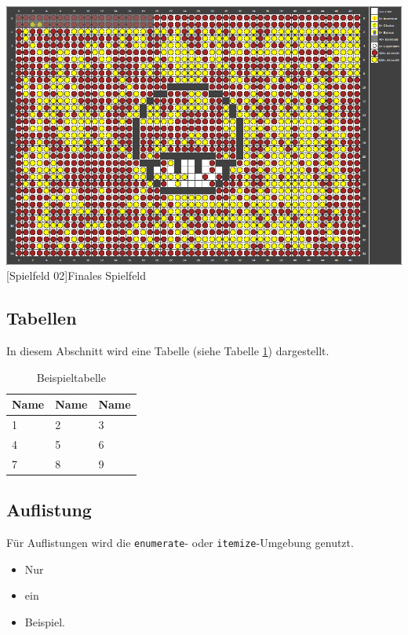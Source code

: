 \documentclass[12pt,a4paper,bibliography=totocnumbered,listof=totocnumbered]{article}
\begin{document}
\vspace{1em}
\begin{minipage}{\linewidth}
	\centering
	\includegraphics[width=0.6\linewidth]{pics/gamefield02.png}
	[Spielfeld 02]{Finales Spielfeld\footnotemark }
	\label{fig:reversi2}
\end{minipage}

\subsection{Tabellen}
In diesem Abschnitt wird eine Tabelle (siehe Tabelle \ref{tab:beispiel}) dargestellt.

\vspace{1em}
\begin{table}[!h]
	\centering
	\begin{tabular}{|l|l|l|}
		\hline
		\textbf{Name} & \textbf{Name} & \textbf{Name}\\
		\hline
		1 & 2 & 3\\
		\hline
		4 & 5 & 6\\
		\hline
		7 & 8 & 9\\
		\hline
	\end{tabular}
	\caption{Beispieltabelle}
	\label{tab:beispiel}
\end{table}


\subsection{Auflistung}
Für Auflistungen wird die \texttt{enumerate}- oder \texttt{itemize}-Umgebung genutzt.

\begin{itemize}
	\item Nur
	\item ein
	\item Beispiel.
\end{itemize}
\end{document}

